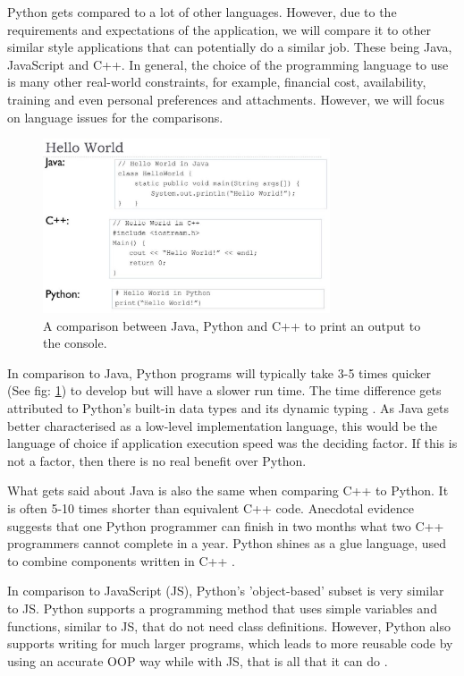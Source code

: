 	Python gets compared to a lot of other languages. However, due to the requirements and expectations of the application, we will compare it to other similar style applications that can potentially do a similar job. These being Java, JavaScript and C++. In general, the choice of the programming language to use is many other real-world constraints, for example, financial cost, availability, training and even personal preferences and attachments. However, we will focus on language issues for the comparisons.
	
	\begin{figure}[t]
		\begin{center}
			\includegraphics[width=8.5cm]{graphics/python_vs_java_vs_c++.jpg}
			\caption{A comparison between Java, Python and C++ to print an output to the console. \cite{py_ja_c++}}
			\label{fig:py_java_c++}
		\end{center}
	\end{figure}
	
	In comparison to Java, Python programs will typically take 3-5 times quicker (See fig: \ref{fig:py_java_c++}) to develop but will have a slower run time. The time difference gets attributed to Python's built-in data types and its dynamic typing \cite{python_comparison}. As Java gets better characterised as a low-level implementation language, this would be the language of choice if application execution speed was the deciding factor. If this is not a factor, then there is no real benefit over Python.
	
	What gets said about Java is also the same when comparing C++ to Python. It is often 5-10 times shorter than equivalent C++ code. Anecdotal evidence suggests that one Python programmer can finish in two months what two C++ programmers cannot complete in a year. Python shines as a glue language, used to combine components written in C++ \cite{python_comparison}.
	
	In comparison to JavaScript (JS), Python's 'object-based' subset is very similar to JS. Python supports a programming method that uses simple variables and functions, similar to JS, that do not need class definitions. However, Python also supports writing for much larger programs, which leads to more reusable code by using an accurate OOP way while with JS, that is all that it can do \cite{python_comparison}.
	
